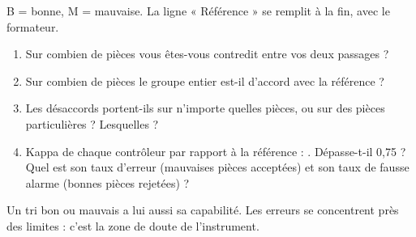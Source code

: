 \documentclass[10pt,a4paper]{article}
\begin{document}
\par{\small B = bonne, M = mauvaise. La ligne « Référence » se remplit à la fin, avec le formateur.}\par
{}
\begin{enumerate}[label=\textcolor{cyan}{\textbf{Q\arabic*.}},leftmargin=22pt]
\item Sur combien de pièces vous êtes-vous contredit entre vos deux passages ?\reponse[1]
\item Sur combien de pièces le groupe entier est-il d'accord avec la référence ?\reponse[1]
\item Les désaccords portent-ils sur n'importe quelles pièces, ou sur des pièces particulières ? Lesquelles ?\reponse[2]
\item Kappa de chaque contrôleur par rapport à la référence : \champ{14mm}. Dépasse-t-il 0,75 ? Quel est son taux d'erreur (mauvaises pièces acceptées) et son taux de fausse alarme (bonnes pièces rejetées) ?\reponse[1]
\end{enumerate}
\begin{tcolorbox}[retenir]Un tri bon ou mauvais a lui aussi sa capabilité. Les erreurs se concentrent près des limites : c'est la zone de doute de l'instrument.\end{tcolorbox}
\end{document}

